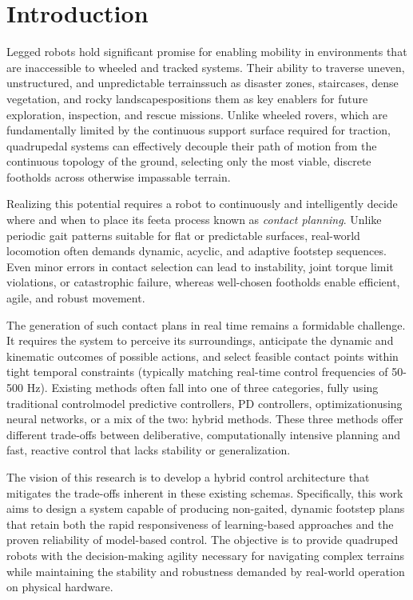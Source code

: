 \section{Introduction}
\label{sec:introduction}

Legged robots hold significant promise for enabling mobility in
environments that are inaccessible to wheeled and tracked systems.
Their ability to traverse uneven, unstructured, and unpredictable
terrains\textemdash such as disaster zones, staircases, dense
vegetation, and rocky landscapes\textemdash positions them as key
enablers for future exploration, inspection, and rescue missions.
Unlike wheeled rovers, which are fundamentally limited by the continuous
support surface required for traction, quadrupedal systems can effectively
decouple their path of motion from the continuous topology of the ground,
selecting only the most viable, discrete footholds across otherwise
impassable terrain.

Realizing this potential requires a robot to continuously and
intelligently decide where and when to place its feet\textemdash a
process known as \textit{contact planning}. Unlike periodic gait
patterns suitable for flat or predictable surfaces, real-world
locomotion often demands dynamic, acyclic, and adaptive footstep
sequences. Even minor errors in contact selection can lead to
instability, joint torque limit violations, or catastrophic failure,
whereas well-chosen footholds enable
efficient, agile, and robust movement.

The generation of such contact plans in real time remains a
formidable challenge. It requires the system to perceive its
surroundings, anticipate the dynamic and kinematic outcomes of
possible actions, and select
feasible contact points within tight temporal constraints (typically
  matching real-time
control frequencies of 50-500 Hz). Existing
methods often fall into one of three categories, fully using
traditional control\textemdash model predictive controllers, PD
controllers, optimization\textemdash using neural networks, or a mix
of the two: hybrid methods. These three methods offer different
trade-offs between deliberative, computationally intensive planning and
fast, reactive control that lacks stability or generalization.

The vision of this research is to develop a hybrid control
architecture that mitigates the trade-offs inherent in these existing
schemas. Specifically, this work
aims to design a system capable of producing non-gaited, dynamic
footstep plans that retain both the rapid responsiveness of learning-based
approaches and the proven reliability of model-based control. The objective
is to provide quadruped robots with the decision-making agility
necessary for navigating complex terrains while maintaining the
stability and robustness demanded by real-world operation on physical hardware.

